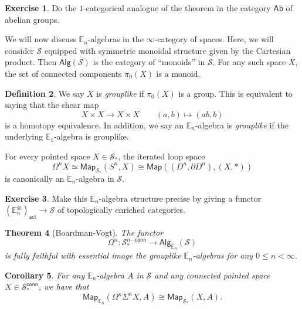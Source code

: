 \documentclass[10pt, oneside]{memoir}
\newtheorem{thm}{Theorem}[subsection]
\newtheorem{cor}[thm]{Corollary}
\theoremstyle{definition}
\newtheorem{defn}[thm]{Definition}
\newtheorem{exer}[thm]{Exercise}
\theoremstyle{remark}
\theoremstyle{plain}
\theoremstyle{definition}
\theoremstyle{remark}
\newcommand{\E}{\mathbb{E}}
\newcommand{\mc}[1]{\mathcal{#1}}
\newcommand{\ms}[1]{\mathsf{#1}}
\newcommand{\1}{\mathbf{1}}
\newcommand{\2}{\mathbf{2}}
\newcommand{\3}{\mathbf{3}}
\begin{document}
\begin{exer}
    Do the $1$-categorical analogue of the theorem in the category $\ms{Ab}$ of abelian groups.
\end{exer}

We will now discuss $\E_n$-algebras in the $\infty$-category of spaces. Here, we will consider $\mc{S}$ equipped with symmetric monoidal structure given by the Cartesian product. Then $\ms{Alg}(\mc{S})$ is the category of ``monoids'' in $\mc{S}$. For any such space $X$, the set of connected components $\pi_0(X)$ is a monoid.

\begin{defn}
    We say $X$ is \textit{grouplike} if $\pi_0 (X)$ is a group. This is equivalent to saying that the shear map
    \[ X \times X \to X \times X \qquad (a,b) \mapsto (ab, b) \]
    is a homotopy equivalence. In addition, we say an $\E_n$-algebra is \textit{grouplike} if the underlying $\E_1$-algebra is grouplike.
\end{defn}

For every pointed space $X \in \mc{S}_*$, the iterated loop space
\[ \Omega^n X \simeq \ms{Map}_{\mc{S}_*}(S^n, X) \cong \ms{Map}((D^n, \partial D^n), (X, *)) \]
is canonically an $\E_n$-algebra in $\mc{S}$.

\begin{exer}
    Make this $\E_n$-algebra structure precise by giving a functor $(\E_n^{\otimes})_{\ms{act}} \to \mc{S}$ of topologically enriched categories.
\end{exer}

\begin{thm}[Boardman-Vogt]\label{thm:enalgspaces}
    The functor 
    \[ \Omega^n \colon \mc{S}_*^{n\ms{-conn}} \to \ms{Alg}_{\E_n}(\mc{S}) \]
    is fully faithful with essential image the grouplike $\E_n$-algebras for any $0 \leq n < \infty$.
\end{thm}

\begin{cor}
    For any $\E_n$-algebra $A$ in $\mc{S}$ and any connected pointed space $X \in \mc{S}_*^{\ms{conn}}$, we have that
    \[ \ms{Map}_{\E_n}(\Omega^n \Sigma^n X, A) \cong \ms{Map}_{\mc{S}_*}(X, A). \]
\end{cor}
\end{document}
